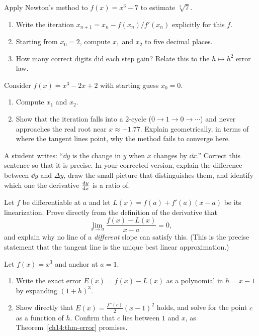 \begin{exercise}
Apply Newton's method to $f(x) = x^3 - 7$ to estimate $\sqrt[3]{7}$.
\begin{enumerate}
\item Write the iteration $x_{n+1} = x_n - f(x_n)/f'(x_n)$ explicitly for this
$f$.
\item Starting from $x_0 = 2$, compute $x_1$ and $x_2$ to five decimal places.
\item How many correct digits did each step gain? Relate this to the
$h\mapsto h^2$ error law.
\end{enumerate}
\end{exercise}

\begin{exercise}
Consider $f(x) = x^3 - 2x + 2$ with starting guess $x_0 = 0$.
\begin{enumerate}
\item Compute $x_1$ and $x_2$.
\item Show that the iteration falls into a $2$-cycle ($0 \to 1 \to 0 \to \cdots$)
and never approaches the real root near $x\approx -1.77$. Explain geometrically,
in terms of where the tangent lines point, why the method fails to converge here.
\end{enumerate}
\end{exercise}

\begin{exercise}
A student writes: ``$\dd y$ is the change in $y$ when $x$ changes by $\dd x$.''
Correct this sentence so that it is precise. In your corrected version, explain
the difference between $\dd y$ and $\Delta y$, draw the small picture that
distinguishes them, and identify which one the derivative $\frac{\mathrm{d} y}{\mathrm{d} x}$ is a ratio
of.
\end{exercise}

\begin{exercise}
Let $f$ be differentiable at $a$ and let $L(x) = f(a)+f'(a)(x-a)$ be its
linearization. Prove directly from the definition of the derivative that
\[
\lim_{x\to a} \frac{f(x)-L(x)}{x-a} = 0,
\]
and explain why no line of a \emph{different} slope can satisfy this. (This is the
precise statement that the tangent line is the unique best linear approximation.)
\end{exercise}

\begin{exercise}
Let $f(x) = x^3$ and anchor at $a=1$.
\begin{enumerate}
\item Write the exact error $E(x) = f(x) - L(x)$ as a polynomial in $h=x-1$ by
expanding $(1+h)^3$.
\item Show directly that $E(x) = \tfrac{f''(c)}{2}(x-1)^2$ holds, and solve for
the point $c$ as a function of $h$. Confirm that $c$ lies between $1$ and $x$, as
Theorem~\ref{ch14:thm-error} promises.
\end{enumerate}
\end{exercise}

